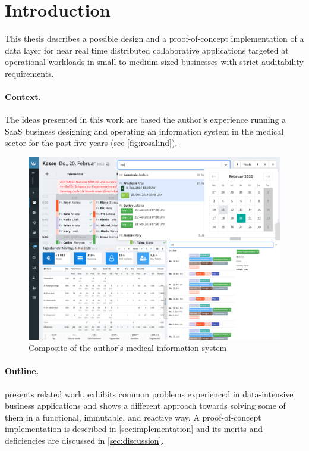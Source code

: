 \section{Introduction}

This thesis describes a possible design and a proof-of-concept implementation of a data layer for near real time distributed collaborative applications targeted at operational workloads in small to medium sized businesses with strict auditability requirements.

\paragraph{Context.} The ideas presented in this work are based the author's experience running a \gls{SaaS} business designing and operating an information system in the medical sector for the past five years (see \autoref{fig:rosalind}).


\begin{figure}[!ht]
  \includegraphics[width=\linewidth]{images/rosalind.png}
  \caption{Composite of the author's medical information system}
  \label{fig:rosalind}
\end{figure}

\paragraph{Outline.}  presents related work.  exhibits common problems experienced in data-intensive business applications and shows a different approach towards solving some of them in a functional, immutable, and reactive way. A proof-of-concept implementation is described in \autoref{sec:implementation} and its merits and deficiencies are discussed in \autoref{sec:discussion}.

